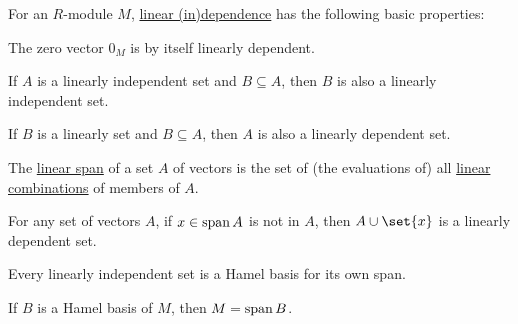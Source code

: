 \begin{proposition}\label{thm:def:module_linear_dependence/properties}
  For an \( R \)-module \( M \), \hyperref[def:module_linear_dependence]{linear (in)dependence} has the following basic properties:
  \begin{thmenum}
     The zero vector \( 0_M \) is by itself linearly dependent.

     If \( A \) is a linearly independent set and \( B \subseteq A \), then \( B \) is also a linearly independent set.

     If \( B \) is a linearly  set and \( B \subseteq A \), then \( A \) is also a linearly dependent set.

     The \hyperref[def:semimodule/submodel]{linear span} of a set \( A \) of vectors is the set of (the evaluations of) all \hyperref[def:linear_combination]{linear combinations} of members of \( A \).

     For any set of vectors \( A \), if \( x \in \operatorname{span} A \) is not in \( A \), then \( A \cup \set{ x } \) is a linearly dependent set.

     Every linearly independent set is a Hamel basis for its own span.

     If \( B \) is a Hamel basis of \( M \), then \( M = \operatorname{span}{ B } \).
  \end{thmenum}
\end{proposition}
